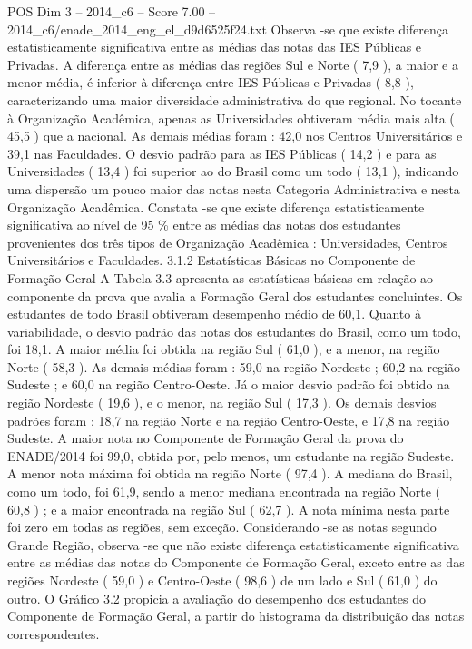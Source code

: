 \begin{textsample}{POS Dim 3 – 2014\_c6 – Score 7.00 – 2014\_c6/enade\_2014\_eng\_el\_d9d6525f24.txt}
Observa -se que existe diferença estatisticamente significativa entre as médias das notas das IES Públicas e Privadas.
A diferença entre as médias das regiões Sul e Norte ( 7,9 ), a maior e a menor média, é inferior à diferença entre IES Públicas e Privadas ( 8,8 ), caracterizando uma maior diversidade administrativa do que regional.
No tocante à Organização Acadêmica, apenas as Universidades obtiveram média mais alta ( 45,5 ) que a nacional.
As demais médias foram : 42,0 nos Centros Universitários e 39,1 nas Faculdades.
O desvio padrão para as IES Públicas ( 14,2 ) e para as Universidades ( 13,4 ) foi superior ao do Brasil como um todo ( 13,1 ), indicando uma dispersão um pouco maior das notas nesta Categoria Administrativa e nesta Organização Acadêmica.
Constata -se que existe diferença estatisticamente significativa ao nível de 95 \% entre as médias das notas dos estudantes provenientes dos três tipos de Organização Acadêmica : Universidades, Centros Universitários e Faculdades. 3.1.2 Estatísticas Básicas no Componente de Formação Geral A Tabela 3.3 apresenta as estatísticas básicas em relação ao componente da prova que avalia a Formação Geral dos estudantes concluintes.
Os estudantes de todo Brasil obtiveram desempenho médio de 60,1.
Quanto à variabilidade, o desvio padrão das notas dos estudantes do Brasil, como um todo, foi 18,1.
A maior média foi obtida na região Sul ( 61,0 ), e a menor, na região Norte ( 58,3 ).
As demais médias foram : 59,0 na região Nordeste ; 60,2 na região Sudeste ; e 60,0 na região Centro-Oeste.
Já o maior desvio padrão foi obtido na região Nordeste ( 19,6 ), e o menor, na região Sul ( 17,3 ).
Os demais desvios padrões foram : 18,7 na região Norte e na região Centro-Oeste, e 17,8 na região Sudeste.
A maior nota no Componente de Formação Geral da prova do ENADE/2014 foi 99,0, obtida por, pelo menos, um estudante na região Sudeste.
A menor nota máxima foi obtida na região Norte ( 97,4 ).
A mediana do Brasil, como um todo, foi 61,9, sendo a menor mediana encontrada na região Norte ( 60,8 ) ; e a maior encontrada na região Sul ( 62,7 ).
A nota mínima nesta parte foi zero em todas as regiões, sem exceção.
Considerando -se as notas segundo Grande Região, observa -se que não existe diferença estatisticamente significativa entre as médias das notas do Componente de Formação Geral, exceto entre as das regiões Nordeste ( 59,0 ) e Centro-Oeste ( 98,6 ) de um lado e Sul ( 61,0 ) do outro.
O Gráfico 3.2 propicia a avaliação do desempenho dos estudantes do Componente de Formação Geral, a partir do histograma da distribuição das notas correspondentes.

\end{textsample}
